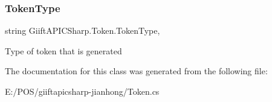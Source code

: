 \subsubsection{\texorpdfstring{Token\+Type}{TokenType}}
{\footnotesize\ttfamily string Giift\+A\+P\+I\+C\+Sharp.\+Token.\+Token\+Type\hspace{0.3cm}{\ttfamily [get]}, {\ttfamily [set]}}



Type of token that is generated 



The documentation for this class was generated from the following file\+:\begin{DoxyCompactItemize}
\item 
E\+:/\+P\+O\+S/giiftapicsharp-\/jianhong/Token.\+cs\end{DoxyCompactItemize}
